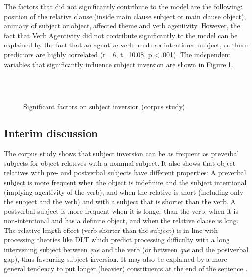 \documentclass[output=paper]{langscibook}
\begin{document}
The factors that did not significantly contribute to the model are the
following: position of the relative clause (inside main clause subject
or main clause object), animacy of subject or object, affected theme
and verb agentivity. However, the fact that Verb Agentivity did not
contribute significantly to the model can be explained by the fact
that an agentive verb needs an intentional subject, so these
predictors are highly correlated (r=.6, t=10.08, p$<$.001). The independent
variables that significantly influence subject inversion are
shown in Figure \ref{figcorpus}.

\begin{figure}
\\
\\
\caption{Significant factors on subject inversion (corpus study)}
\label{figcorpus}
\end{figure}

\subsection{Interim discussion}


The corpus study shows that subject inversion can be as frequent as preverbal subjects for object relatives with a nominal subject. It also shows that object relatives with pre- and postverbal subjects have different properties: A preverbal subject is more frequent when the object is indefinite and  the subject intentional (implying agentivity of the verb), and  when the relative is short (including only the subject and the verb) and with a subject that is shorter than the verb.  A postverbal subject is more frequent when it is longer than the verb, when it is non-intentional and has a definite object, and when the relative clause is long. 
The relative length effect (verb shorter than the subject) is in line with processing theories like DLT which predict processing difficulty with a long intervening subject between {\textit{que}} and the verb (or between {\textit{que}} and the postverbal gap), thus favouring subject inversion. It may also be explained by a more general tendency to put longer (heavier) constituents at the end of the sentence  \citep{Behaghel, wasow2002postverbal}. 
\end{document}
